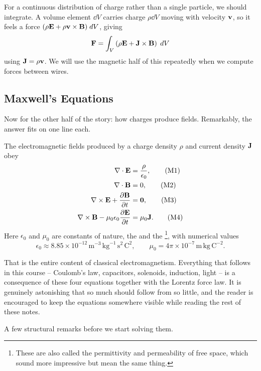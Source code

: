\documentclass[a4paper]{scrartcl}
\begin{document}
For a continuous distribution of charge rather than a single particle, we should integrate. A volume element $\dd V$ carries charge $\rho \dd V$ moving with velocity $\mathbf{v}$, so it feels a force $(\rho \mathbf{E} + \rho \mathbf{v}\times \mathbf{B})\; d V$, giving
$$
\mathbf{F} = \int_V \left(\rho \mathbf{E} + \mathbf{J} \times \mathbf{B}\right) \; d V
$$
using $\mathbf{J} = \rho \mathbf{v}$. We will use the magnetic half of this repeatedly when we compute forces between wires.

\subsection{Maxwell's Equations}

Now for the other half of the story: how charges produce fields. Remarkably, the answer fits on one line each.

\begin{law}
	\label{law:maxwell}
	The electromagnetic fields produced by a charge density $\rho$ and current density $\mathbf{J}$ obey
	\begin{align*}
		\nabla \cdot \mathbf{E} &= \frac{\rho}{\epsilon_0}, \tag{M1}\\
		\nabla \cdot \mathbf{B} &= 0, \tag{M2}\\
		\nabla \times \mathbf{E} + \frac{\partial \mathbf{B}}{\partial t} &= \mathbf{0}, \tag{M3}\\
		\nabla \times \mathbf{B} - \mu_0 \epsilon_0 \frac{\partial \mathbf{E}}{\partial t} &= \mu_0 \mathbf{J}. \tag{M4}
	\end{align*}
	Here $\epsilon_0$ and $\mu_0$ are constants of nature, the  and the \footnote{These are also called the permittivity and permeability of free space, which sound more impressive but mean the same thing.}, with numerical values
	$$
	\epsilon_0 \approx 8.85 \times 10^{-12}\,\mathrm{m}^{-3}\,\mathrm{kg}^{-1}\,\mathrm{s}^{2}\,\mathrm{C}^{2}, \qquad \mu_0 = 4\pi \times 10^{-7}\,\mathrm{m}\,\mathrm{kg}\,\mathrm{C}^{-2}.
	$$
\end{law}

That is the entire content of classical electromagnetism. Everything that follows in this course -- Coulomb's law, capacitors, solenoids, induction, light -- is a consequence of these four equations together with the Lorentz force law. It is genuinely astonishing that so much should follow from so little, and the reader is encouraged to keep the equations somewhere visible while reading the rest of these notes.

A few structural remarks before we start solving them.
\end{document}
